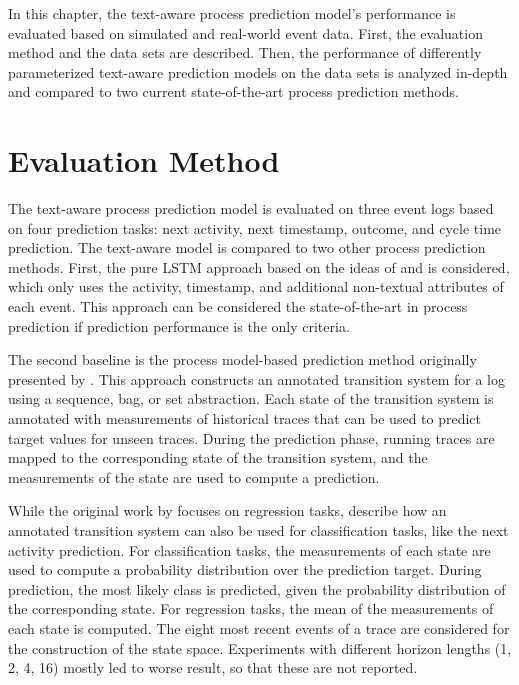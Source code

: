 In this chapter, the text-aware process prediction model’s performance is evaluated based on simulated and real-world event data.
First, the evaluation method and the data sets are described.
Then, the performance of differently parameterized text-aware prediction models on the data sets is analyzed in-depth and compared to two current state-of-the-art process prediction methods.

\section{Evaluation Method}

The text-aware process prediction model is evaluated on three event logs based on four prediction tasks: next activity, next timestamp, outcome, and cycle time prediction.
The text-aware model is compared to two other process prediction methods.
First, the pure LSTM approach based on the ideas of \citeauthor{DBLP:conf/caise/TaxVRD17} \cite{DBLP:conf/caise/TaxVRD17} and \citeauthor{DBLP:conf/ssci/NavarinVPS17} \cite{DBLP:conf/ssci/NavarinVPS17} is considered, which only uses the activity, timestamp, and additional non-textual attributes of each event.
This approach can be considered the state-of-the-art in process prediction if prediction performance is the only criteria.

The second baseline is the process model-based prediction method originally presented by \citeauthor{DBLP:journals/is/AalstSS11} \cite{DBLP:journals/is/AalstSS11}.
This approach constructs an annotated transition system for a log using a sequence, bag, or set abstraction.
Each state of the transition system is annotated with measurements of historical traces that can be used to predict target values for unseen traces.
During the prediction phase, running traces are mapped to the corresponding state of the transition system, and the measurements of the state are used to compute a prediction.

While the original work by \citeauthor{DBLP:journals/is/AalstSS11} focuses on regression tasks, \citeauthor{DBLP:journals/sosym/TaxTZ20} \cite{DBLP:journals/sosym/TaxTZ20} describe how an annotated transition system can also be used for classification tasks, like the next activity prediction.
For classification tasks, the measurements of each state are used to compute a probability distribution over the prediction target.
During prediction, the most likely class is predicted, given the probability distribution of the corresponding state.
For regression tasks, the mean of the measurements of each state is computed.
The eight most recent events of a trace are considered for the construction of the state space.
Experiments with different horizon lengths (1, 2, 4, 16) mostly led to worse result, so that these are not reported.

